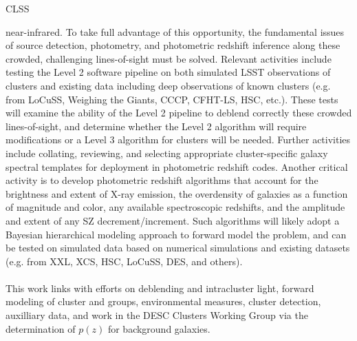 {\begin{tasklist}{CLSS}
\begin{task}
{near-infrared.  To take full advantage of this opportunity, the 
fundamental issues of source detection, photometry, and photometric 
redshift inference along these crowded, challenging lines-of-sight must 
be solved. Relevant activities include testing the Level 2 
software pipeline on both simulated LSST observations of clusters and 
existing data including deep
observations of known clusters (e.g. from LoCuSS, Weighing the Giants, 
CCCP, CFHT-LS, HSC, etc.).  These tests will examine the ability of 
the Level 2 pipeline to deblend correctly these crowded lines-of-sight,
and determine whether the Level 2 algorithm will require modifications
or a Level 3 algorithm for clusters will be needed.
Further activities include collating, reviewing, and selecting 
appropriate cluster-specific galaxy spectral templates for deployment in 
photometric redshift codes.  
Another critical activity is to develop photometric 
redshift algorithms that account for the brightness and 
extent of X-ray emission, the overdensity of galaxies as a function of 
magnitude and color, any available spectroscopic redshifts, and the 
amplitude and extent of any SZ decrement/increment. 
Such algorithms will 
likely adopt a Bayesian hierarchical modeling approach to forward model 
the problem, and can be tested on simulated data based on numerical 
simulations and existing datasets (e.g. from XXL, XCS, HSC, LoCuSS, DES, 
and others). 
~\\~\\
This work links with efforts on deblending and
intracluster light, forward 
modeling of cluster and groups, environmental measures, cluster 
detection, auxilliary data, and work in the DESC Clusters Working Group 
via the determination of $p(z)$ for background galaxies.}
~\\
\end{task}




\end{tasklist}}
